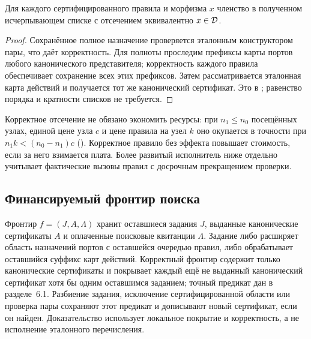 \begin{theorem}\label{thm:prune}
Для каждого сертифицированного правила и морфизма $x$ членство в полученном исчерпывающем списке с отсечением эквивалентно $x\in\mathcal D$.
\end{theorem}
\begin{proof}
Сохранённое полное назначение проверяется эталонным конструктором пары, что даёт корректность. Для полноты проследим префиксы карты портов любого канонического представителя; корректность каждого правила обеспечивает сохранение всех этих префиксов. Затем рассматривается эталонная карта действий и получается тот же канонический сертификат. Это  в ; равенство порядка и кратности списков не требуется.
\end{proof}
Корректное отсечение не обязано экономить ресурсы: при $n_1\le n_0$ посещённых узлах, единой цене узла $c$ и цене правила на узел $k$ оно окупается в точности при $n_1 k<(n_0-n_1)c$ (). Корректное правило без эффекта повышает стоимость, если за него взимается плата. Более развитый исполнитель ниже отдельно учитывает фактические вызовы правил с досрочным прекращением проверки.

\subsection{Финансируемый фронтир поиска}
Фронтир $f=(J,A,\Lambda)$ хранит оставшиеся задания $J$, выданные канонические сертификаты $A$ и оплаченные поисковые квитанции $\Lambda$. Задание либо расширяет область назначений портов с оставшейся очередью правил, либо обрабатывает оставшийся суффикс карт действий. Корректный фронтир содержит только канонические сертификаты и покрывает каждый ещё не выданный канонический сертификат хотя бы одним оставшимся заданием; точный предикат дан в разделе~6.1. Разбиение задания, исключение сертифицированной области или проверка пары сохраняют этот предикат и дописывают новый сертификат, если он найден. Доказательство использует локальное покрытие и корректность, а не исполнение эталонного перечисления.

